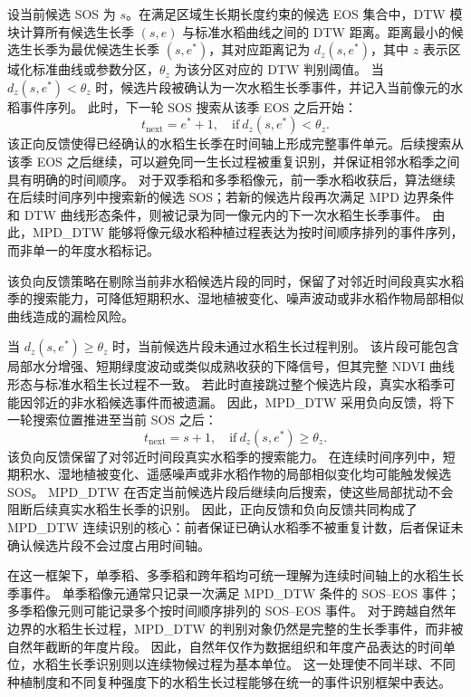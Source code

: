 设当前候选 SOS 为 \(s\)。在满足区域生长期长度约束的候选 EOS 集合中，DTW 模块计算所有候选生长季 \((s,e)\) 与标准水稻曲线之间的 DTW 距离。距离最小的候选生长季为最优候选生长季 \((s,e^{*})\)，其对应距离记为 \(d_z(s,e^{*})\)，其中 \(z\) 表示区域化标准曲线或参数分区，\(\theta_z\) 为该分区对应的 DTW 判别阈值。
当 \(d_z(s,e^{*})<\theta_z\) 时，候选片段被确认为一次水稻生长季事件，并记入当前像元的水稻事件序列。
此时，下一轮 SOS 搜索从该季 EOS 之后开始：
\begin{equation}
    t_{\mathrm{next}}=e^{*}+1,\quad \mathrm{if}\ d_z(s,e^{*})<\theta_z.
    \label{eq:positive_feedback}
\end{equation}
该正向反馈使得已经确认的水稻生长季在时间轴上形成完整事件单元。后续搜索从该季 EOS 之后继续，可以避免同一生长过程被重复识别，并保证相邻水稻季之间具有明确的时间顺序。
对于双季稻和多季稻像元，前一季水稻收获后，算法继续在后续时间序列中搜索新的候选 SOS；若新的候选片段再次满足 MPD 边界条件和 DTW 曲线形态条件，则被记录为同一像元内的下一次水稻生长季事件。
由此，MPD\_DTW 能够将像元级水稻种植过程表达为按时间顺序排列的事件序列，而非单一的年度水稻标记。

该负向反馈策略在剔除当前非水稻候选片段的同时，保留了对邻近时间段真实水稻季的搜索能力，可降低短期积水、湿地植被变化、噪声波动或非水稻作物局部相似曲线造成的漏检风险。

当 \(d_z(s,e^{*})\geq\theta_z\) 时，当前候选片段未通过水稻生长过程判别。
该片段可能包含局部水分增强、短期绿度波动或类似成熟收获的下降信号，但其完整 NDVI 曲线形态与标准水稻生长过程不一致。
若此时直接跳过整个候选片段，真实水稻季可能因邻近的非水稻候选事件而被遗漏。
因此，MPD\_DTW 采用负向反馈，将下一轮搜索位置推进至当前 SOS 之后：
\begin{equation}
    t_{\mathrm{next}}=s+1,\quad \mathrm{if}\ d_z(s,e^{*})\geq\theta_z.
    \label{eq:negative_feedback}
\end{equation}
该负向反馈保留了对邻近时间段真实水稻季的搜索能力。
在连续时间序列中，短期积水、湿地植被变化、遥感噪声或非水稻作物的局部相似变化均可能触发候选 SOS。
MPD\_DTW 在否定当前候选片段后继续向后搜索，使这些局部扰动不会阻断后续真实水稻生长季的识别。
因此，正向反馈和负向反馈共同构成了 MPD\_DTW 连续识别的核心：前者保证已确认水稻季不被重复计数，后者保证未确认候选片段不会过度占用时间轴。

在这一框架下，单季稻、多季稻和跨年稻均可统一理解为连续时间轴上的水稻生长季事件。
单季稻像元通常只记录一次满足 MPD\_DTW 条件的 SOS--EOS 事件；多季稻像元则可能记录多个按时间顺序排列的 SOS--EOS 事件。
对于跨越自然年边界的水稻生长过程，MPD\_DTW 的判别对象仍然是完整的生长季事件，而非被自然年截断的年度片段。
因此，自然年仅作为数据组织和年度产品表达的时间单位，水稻生长季识别则以连续物候过程为基本单位。
这一处理使不同半球、不同种植制度和不同复种强度下的水稻生长过程能够在统一的事件识别框架中表达。

